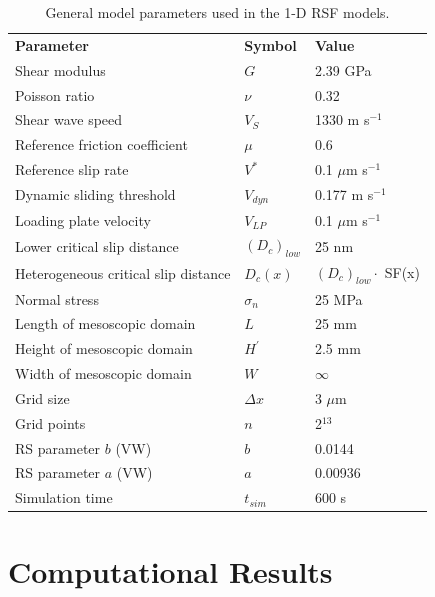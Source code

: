 \documentclass[preprint,1p, 10pt,authoryear]{elsarticle}
\begin{document}
\begin{table}[ht]
	\centering
	\caption{General model parameters used in the 1-D RSF models.}
	\begin{tabular}{ m{5cm} m{2cm} m{4cm}} 
		\hline  
		\bf{Parameter} 			& \bf{Symbol} 		& \bf{Value}	\\
		Shear modulus  			& $G$  		 	& 2.39 GPa		\\
		Poisson ratio  			& $\nu$  	 	& 0.32 		\\
		Shear wave speed		& $V_{S}$      		& 1330 m s$^{-1}$	\\
		Reference friction coefficient	& $\mu$	        & 0.6	\\
		Reference slip rate  		& $V^{*}$     		&  0.1 $\mu$m s$^{-1}$\\
		Dynamic sliding threshold   	& $V_{dyn}$  		& 0.177 m s$^{-1}$ \\
		Loading plate velocity  	& $V_{LP}$     		&  0.1 $\mu$m s$^{-1}$\\
		Lower critical slip distance 	& $\left(D_{c}\right)_{low}$    &  25 nm\\
        Heterogeneous critical slip distance 	& $D_{c}(x)$    &  $\left(D_{c}\right)_{low} \cdot$ SF(x)\\
  		Normal stress 			& $\sigma_{n}$  		&  25 MPa \\
		Length of mesoscopic domain 	&   $L$  		& 25 mm\\
		Height of mesoscopic domain 	&   $H^{'}$  		& 2.5 mm\\
		Width of mesoscopic domain 	&   $W$   		& $\infty$\\
		Grid size 			& $\Delta x$ 		& 3 $\mu$m \\
		Grid points 			& $n$ 			& 2$^{13}$ \\
		RS parameter $b$ (VW)  		& $b$ 			& 0.0144  \\
		RS parameter $a$ (VW)  		& $a$ 			& 0.00936  \\
	    Simulation time 			& $t_{sim}$ 		& 600 s  \\
		\hline  	
	\end{tabular}
	\label{table1}
\end{table}

\section{Computational Results}
\end{document}
